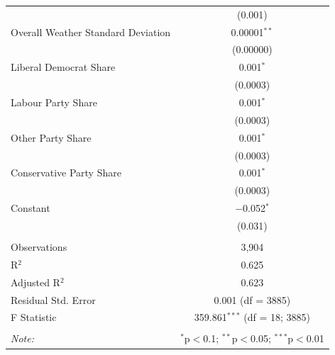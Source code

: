 \documentclass[preprint,12pt,authoryear]{elsarticle}
\begin{document}
\begin{table}[!htbp]
\begin{tabular}{@{\extracolsep{5pt}}lc}
	& (0.001) \\
 Overall Weather Standard Deviation & 0.00001$^{**}$ \\ 
	& (0.00000) \\
 Liberal Democrat Share & 0.001$^{*}$ \\
	& (0.0003) \\
 Labour Party Share & 0.001$^{*}$ \\
	& (0.0003) \\
 Other Party Share & 0.001$^{*}$ \\
	& (0.0003) \\
 Conservative Party Share & 0.001$^{*}$ \\
	& (0.0003) \\
 Constant & $-$0.052$^{*}$ \\
	& (0.031) \\ 
\hline \\[-1.8ex]
Observations & 3,904 \\
R$^{2}$ & 0.625 \\
Adjusted R$^{2}$ & 0.623 \\
Residual Std. Error & 0.001 (df = 3885) \\
F Statistic & 359.861$^{***}$ (df = 18; 3885) \\
\hline 
\hline \\[-1.8ex]
\textit{Note:}  & \multicolumn{1}{r}{$^{*}$p$<$0.1; $^{**}$p$<$0.05; $^{***}$p$<$0.01} \\
\end{tabular}
\end{table}
\end{document}
